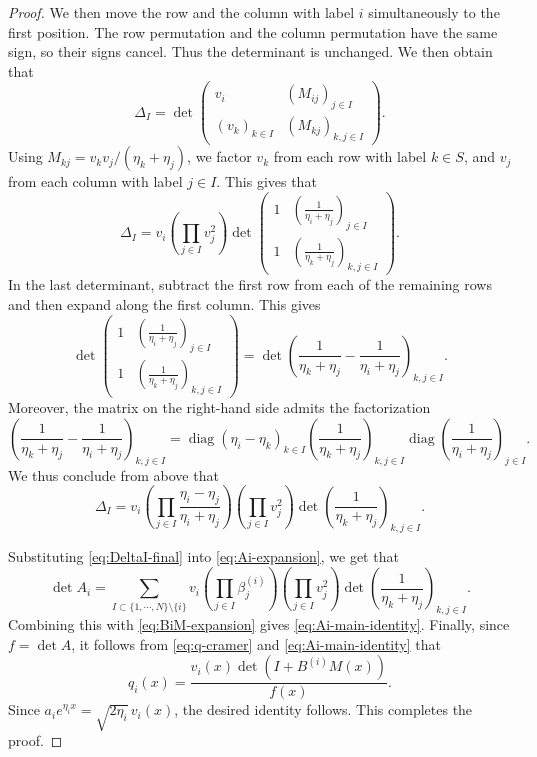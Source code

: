 \documentclass[11pt]{article}
\numberwithin{equation}{section}
\theoremstyle{definition}
\begin{document}
\begin{proof}
We then move the row and the column with label \(i\) simultaneously to the
first position. The row permutation and the column permutation have the same
sign, so their signs cancel. Thus the determinant is unchanged. We then obtain that
\begin{equation}\label{eq:DeltaI-block}
	\Delta_I
	=
	\det
	\begin{pmatrix}
		v_i & (M_{ij})_{j\in I}\\
		(v_k)_{k\in I} & (M_{kj})_{k,j\in I}
	\end{pmatrix}.
\end{equation}
Using \(M_{kj}=v_kv_j/(\eta_k+\eta_j)\), we factor \(v_k\) from each row
with label \(k\in S\), and \(v_j\) from each column with label \(j\in I\).
This gives that
\begin{equation}\label{eq:DeltaI-factor}
	\Delta_I
	=
	v_i\left(\prod_{j\in I}v_j^2\right)
	\det
	\begin{pmatrix}
		1 & \left(\frac{1}{\eta_i+\eta_j}\right)_{j\in I}\\
		1 & \left(\frac{1}{\eta_k+\eta_j}\right)_{k,j\in I}
	\end{pmatrix}.
\end{equation}
In the last determinant, subtract the first row from each of the remaining
rows and then expand along the first column. This gives
\[
\det
\begin{pmatrix}
	1 & \left(\frac{1}{\eta_i+\eta_j}\right)_{j\in I}\\
	1 & \left(\frac{1}{\eta_k+\eta_j}\right)_{k,j\in I}
\end{pmatrix}
=
\det
\left(
\frac{1}{\eta_k+\eta_j}
-
\frac{1}{\eta_i+\eta_j}
\right)_{k,j\in I}.
\]
Moreover, the matrix on the right-hand side admits the factorization
\[
\left(
\frac{1}{\eta_k+\eta_j}
-
\frac{1}{\eta_i+\eta_j}
\right)_{k,j\in I}
=
\operatorname{diag}(\eta_i-\eta_k)_{k\in I}
\left(\frac{1}{\eta_k+\eta_j}\right)_{k,j\in I}
\operatorname{diag}\left(\frac{1}{\eta_i+\eta_j}\right)_{j\in I}.
\]
We thus conclude from above that
\begin{equation}\label{eq:DeltaI-final}
\Delta_I
=
v_i
\left(\prod_{j\in I}
\frac{\eta_i-\eta_j}{\eta_i+\eta_j}
\right)
\left(\prod_{j\in I}v_j^2\right)
\det\left(\frac{1}{\eta_k+\eta_j}\right)_{k,j\in I}.
\end{equation}

	
Substituting \eqref{eq:DeltaI-final} into \eqref{eq:Ai-expansion}, we get that
\begin{equation*}
\det A_i
=
\sum_{I\subset\{1,\cdots,N\}\setminus\{i\}}
v_i\left(\prod_{j\in I}\beta_j^{(i)}\right)
\left(\prod_{j\in I}v_j^2\right)
\det\left(\frac{1}{\eta_k+\eta_j}\right)_{k,j\in I}.
\end{equation*}
Combining this with \eqref{eq:BiM-expansion} gives
\eqref{eq:Ai-main-identity}. Finally, since \(f=\det A\), it follows from \eqref{eq:q-cramer}  and
\eqref{eq:Ai-main-identity} that
\[
q_i(x)
=
\frac{v_i(x)\det(I+B^{(i)}M(x))}{f(x)}.
\]
Since \(a_i e^{\eta_i x}=\sqrt{2\eta_i}\,v_i(x)\), the desired identity follows.
This completes the proof.
\end{proof}
\end{document}
